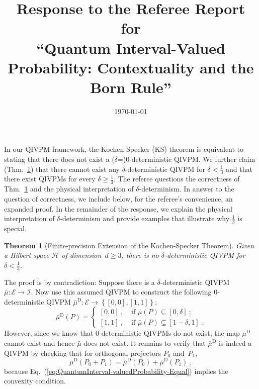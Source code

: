 \documentclass[english,reprint, aps, prl,superscriptaddress, showpacs,
showkeys, longbibliography, amsmath, amssymb, floatfix]{revtex4-1}
\theoremstyle{plain}
\newtheorem{thm}{Theorem}
\theoremstyle{definition}
\newcommand{\Hilb}{\mathcal{H}}
\newcommand{\events}{\ensuremath{\mathcal{E}}}
\newcommand{\imposs}{\ensuremath{\left[0,0\right]}}
\newcommand{\necess}{\ensuremath{\left[1,1\right]}}
\begin{document}
\title{Response to the Referee Report for \\
``Quantum Interval-Valued Probability: Contextuality and the Born Rule''}
\date{\today}

\maketitle


\noindent In our QIVPM framework, the Kochen-Specker (KS) theorem is
equivalent to stating that there does not exist a
($\delta$=)$0$-deterministic QIVPM. We further claim
(Thm.~\ref{cor:Kochen-Specker-IVPM}) that there cannot exist any
$\delta$-deterministic QIVPM for $\delta<\frac{1}{3}$ and that there
exist QIVPMs for every $\delta\ge\frac{1}{3}$.  The referee questions
the correctness of Thm.~\ref{cor:Kochen-Specker-IVPM} and the physical
interpretation of $\delta$-determinism. In answer to the question of
correctness, we include below, for the referee's convenience, an
expanded proof. In the remainder of the response, we explain the
physical interpretation of $\delta$-determinism and provide examples
that illustrate why $\frac{1}{3}$ is special.

\begin{thm}[Finite-precision Extension of the Kochen-Specker Theorem]
\label{cor:Kochen-Specker-IVPM} Given a Hilbert space $\Hilb$ of
dimension~$d\ge3$, there is no $\delta$-deterministic QIVPM for
$\delta<\frac{1}{3}$.\end{thm}

The proof is by contradiction: Suppose there is a $\delta$-deterministic
QIVPM~$\bar{\mu}:\events\rightarrow\mathscr{I}$. Now use this assumed
QIVPM to construct the following $0$-deterministic QIVPM $\bar{\mu}^{\textrm{D}}:\events\rightarrow\left\{ \imposs,\necess\right\} $:
\begin{equation}
\bar{\mu}^{\textrm{D}}\left(P\right)=\begin{cases}
\imposs\,, & \textrm{ if }\bar{\mu}\left(P\right)\subseteq\left[0,\delta\right]\:;\\
\necess\,, & \textrm{ if }\bar{\mu}\left(P\right)\subseteq\left[1-\delta,1\right]\:.
\end{cases}
\end{equation}
However, since we know that $0$-deterministic QIVPMs do not exist,
the map $\bar{\mu}^{\textrm{D}}$ cannot exist and hence $\bar{\mu}$
does not exist. It remains to verify that $\bar{\mu}^{\textrm{D}}$
is indeed a QIVPM by checking that for orthogonal projectors $P_{0}$
and~$P_{1}$, 
\begin{equation}
\bar{\mu}^{\textrm{D}}\left(P_{0}+P_{1}\right)=\bar{\mu}^{\textrm{D}}\left(P_{0}\right)+\bar{\mu}^{\textrm{D}}\left(P_{1}\right)\,,\label{eq:QuantumInterval-valuedProbability-Equal}
\end{equation}
because Eq.~(\ref{eq:QuantumInterval-valuedProbability-Equal}) implies
the convexity condition.
\end{document}
